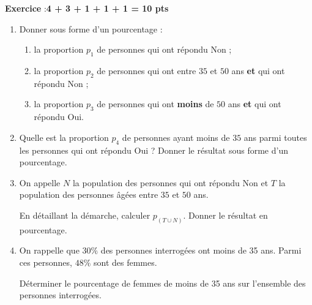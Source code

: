 \documentclass[10pt,french]{book}
\newcounter{exoc}
\newenvironment{exoc}[1]{%
  \refstepcounter{exoc}\textbf{Exercice \theexoc} :\hfill {\textbf{#1}}\par
  \medskip}%
{\medskip}
\begin{document}
\begin{exoc}{4 + 3 + 1 + 1 + 1 = 10 pts}
\begin{enumerate}
    \item Donner sous forme d'un pourcentage :
        \begin{enumerate}
            \item la proportion $p_1$ de personnes qui ont répondu Non ;
            \item la proportion $p_2$ de personnes qui ont entre $35$ et $50$ ans \textbf{et} qui ont répondu Non ;
            \item  la proportion $p_3$ de personnes qui ont \textbf{moins} de $50$ ans \textbf{et} qui ont répondu Oui.
        \end{enumerate}
    \item Quelle est la proportion $p_4$ de personnes ayant moins de $35$ ans parmi toutes les personnes qui ont répondu Oui ?
    Donner le résultat sous forme d'un pourcentage.
    \item On appelle $N$ la population des personnes qui ont répondu Non et $T$ la population des personnes âgées entre $35$ et $50$ ans.\par
    En détaillant la démarche, calculer $p_{(T \cup N)}$. Donner le résultat en pourcentage.
    \item On rappelle que $30\%$ des personnes interrogées ont moins de 35 ans. Parmi ces personnes, $48\%$ sont des femmes.\par
    Déterminer le pourcentage de femmes de moins de 35 ans sur l'ensemble des personnes interrogées.
\end{enumerate}
\end{exoc}
\end{document}
